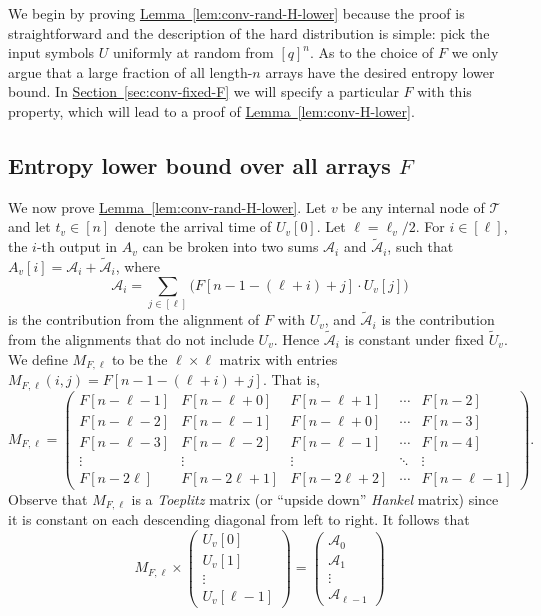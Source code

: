 \documentclass[11pt]{article}
\numberwithin{equation}{section}
\theoremstyle{definition}
\theoremstyle{plain}
\newcommand{\expref}[2]{\hyperref[#2]{#1~\ref{#2}}}
\newcommand{\calA}{\ensuremath{\mathcal{A}}}
\newcommand{\calT}{\ensuremath{\mathcal{T}}}
\newcommand{\MFL}{\ensuremath{M_{F,\ell}}}
\newcommand{\Xv}{\ensuremath{U_v}}
\newcommand{\Xvknown}{\ensuremath{\widetilde{U}_v}}
\newcommand{\Yv}{\ensuremath{A_v}}
\begin{document}
We begin by proving \expref{Lemma}{lem:conv-rand-H-lower} because the proof is straightforward and the description of the hard distribution is simple: pick the input symbols $U$ uniformly at random from $[q]^n$. As to the choice of $F$ we only argue that a large fraction of all
%
length-$n$
arrays have the desired entropy lower bound. In \expref{Section}{sec:conv-fixed-F} we will specify a particular $F$ with this property, which will lead to a proof of \expref{Lemma}{lem:conv-H-lower}.


\subsection{Entropy lower bound over all arrays \texorpdfstring{$F$}{F}} \label{sec:conv-random-F}

We now prove \expref{Lemma}{lem:conv-rand-H-lower}.
Let $v$ be any internal node of $\calT$ and let $t_v\in[n]$ denote the arrival time of $\Xv[0]$.
Let $\ell=\ell_v/2$.
For $i\in [\ell]$, the $i$-th output in $\Yv$ can be broken into two sums $\calA_i$ and $\widetilde{\calA}_i$, such that $\Yv[i] = \calA_i + \widetilde{\calA}_i$, where
%
\begin{equation*}
\calA_i = \sum_{j\in[\ell]} \big(F[n-1-(\ell+i)+j]\cdot U_v[j]\big)
\end{equation*}
%
is the contribution from the alignment of $F$ with $U_v$, and $\widetilde{\calA}_i$ is the contribution from the alignments that do not include $U_v$. Hence $\widetilde{\calA}_i$ is constant under fixed $\Xvknown$.
We define $\MFL$ to be the $\ell \times \ell$ matrix with entries $\MFL(i,j)= F[n-1-(\ell+i)+j]$. That is,
%
\begin{equation*}
\MFL =
\begin{pmatrix}
F[n-\ell-1] & F[n-\ell+0] & F[n-\ell+1] & \cdots & F[n-2] \\
F[n-\ell-2] & F[n-\ell-1] & F[n-\ell+0] & \cdots & F[n-3] \\
F[n-\ell-3] & F[n-\ell-2] & F[n-\ell-1] & \cdots & F[n-4] \\
\vdots  & \vdots & \vdots & \ddots & \vdots  \\
F[n-2\ell] & F[n-2\ell+1] & F[n-2\ell+2] & \cdots & F[n-\ell-1]
\end{pmatrix}.
\end{equation*}
%
Observe that $\MFL$ is a \emph{Toeplitz} matrix (or ``upside down'' \emph{Hankel} matrix) since it is constant on each descending diagonal from left to right.
%
It follows that
%
\begin{equation}
\label{eq:matrix}
\MFL\times
\begin{pmatrix}
U_v[0] \\
U_v[1] \\
\vdots \\
U_v[\ell-1]
\end{pmatrix}
=
\begin{pmatrix}
\calA_0 \\
\calA_1 \\
\vdots \\
\calA_{\ell-1}
\end{pmatrix}
\end{equation}
\end{document}
